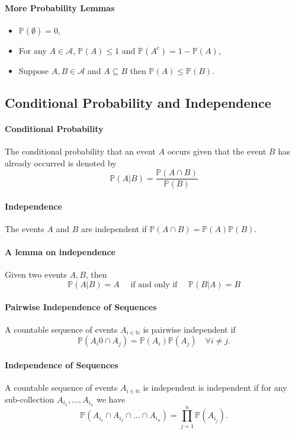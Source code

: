 \paragraph{More Probability Lemmas}
\begin{itemize}
    \item \(\mathbb{P} (\emptyset) = 0\),
    \item For any \(A\in\mathcal{A}\), \(\mathbb{P}(A) \leq 1\) and \(\mathbb{P}(A^c) = 1-\mathbb{P}(A)\),
    \item Suppose \(A, B\in\mathcal{A}\) and \(A\subseteq B\) then \(\mathbb{P}(A) \leq \mathbb{P}(B) \).
\end{itemize}

\subsection{Conditional Probability and Independence}

\paragraph{Conditional Probability}
The conditional probability that an event \(A\) occurs given that the event
\(B\) has already occurred is denoted by 
\[
    \mathbb{P} (A|B) = \frac{\mathbb{P} (A \cap B)}{\mathbb{P} (B)}
\]

\paragraph{Independence}
The events \(A\) and \(B\) are independent if
\(
    \mathbb{P}(A\cap B) = \mathbb{P}(A)\mathbb{P}(B).
\)

\paragraph{A lemma on independence}
Given two events \(A, B\), then 
\[
    \mathbb{P}(A | B) = A
    \quad \text{ if and only if } \quad
    \mathbb{P}(B | A) = B
\]

\paragraph{Pairwise Independence of Sequences}
A countable sequence of events \(A_{i\in\mathbb{N}}\) is pairwise independent
if  \[
    \mathbb{P}(A_i0 \cap A_j) = \mathbb{P} (A_i) \mathbb{P}(A_j) \quad
    \forall i\neq j.
\]

\paragraph{Independence of Sequences}
A countable sequence of events \(A_{i\in\mathbb{N}}\) is independent is
independent if for any sub-collection \(A_{i_1},\dots, A_{i_n}\) we have
\[
    \mathbb{P}(A_{i_1} \cap A_{i_2}\cap\dots\cap A_{i_n})
    =
    \prod_{j=1}^{n} \mathbb{P}(A_{i_j}).
\]

